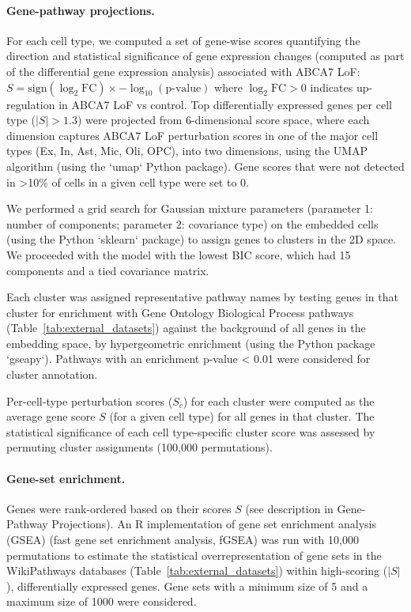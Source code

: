 \paragraph{Gene-pathway projections.}
For each cell type, we computed a set of gene-wise scores quantifying the direction and statistical significance of gene expression changes (computed as part of the differential gene expression analysis) associated with ABCA7 LoF:
$ S = \text{sign}(\log_2\text{FC}) \times -\log_{10}(\text{p-value}) $
where $\log_2\text{FC} > 0$ indicates up-regulation in ABCA7 LoF vs control. Top differentially expressed genes per cell type ($|S| > 1.3$) were projected from 6-dimensional score space, where each dimension captures ABCA7 LoF perturbation scores in one of the major cell types (Ex, In, Ast, Mic, Oli, OPC), into two dimensions, using the UMAP algorithm (using the `umap` Python package). Gene scores that were not detected in >10\% of cells in a given cell type were set to 0.

We performed a grid search for Gaussian mixture parameters (parameter 1: number of components; parameter 2: covariance type) on the embedded cells (using the Python `sklearn` package) to assign genes to clusters in the 2D space. We proceeded with the model with the lowest BIC score, which had 15 components and a tied covariance matrix.

Each cluster was assigned representative pathway names by testing genes in that cluster for enrichment with Gene Ontology Biological Process pathways (Table~\ref{tab:external_datasets}) against the background of all genes in the embedding space, by hypergeometric enrichment (using the Python package `gseapy`). Pathways with an enrichment p-value < 0.01 were considered for cluster annotation.

Per-cell-type perturbation scores ($S_c$) for each cluster were computed as the average gene score $S$ (for a given cell type) for all genes in that cluster. The statistical significance of each cell type-specific cluster score was assessed by permuting cluster assignments (100,000 permutations).

\paragraph{Gene-set enrichment.}
Genes were rank-ordered based on their scores $S$ (see description in Gene-Pathway Projections). An R implementation of gene set enrichment analysis (GSEA) \cite{Subramanian2005-gt} (fast gene set enrichment analysis, fGSEA) was run with 10,000 permutations to estimate the statistical overrepresentation of gene sets in the WikiPathways databases (Table~\ref{tab:external_datasets}) within high-scoring ($|S|$), differentially expressed genes. Gene sets with a minimum size of 5 and a maximum size of 1000 were considered.

